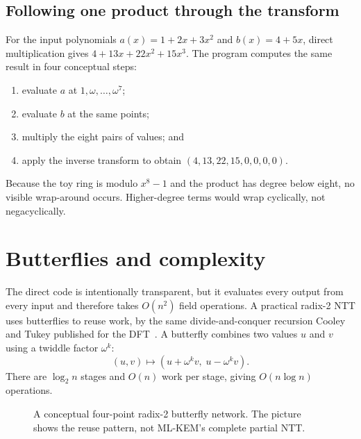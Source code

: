 \subsection{Following one product through the transform}

For the input polynomials $a(x)=1+2x+3x^2$ and $b(x)=4+5x$, direct multiplication gives $4+13x+22x^2+15x^3$. The program computes the same result in four conceptual steps:
\begin{enumerate}
  \item evaluate $a$ at $1,\omega,\ldots,\omega^7$;
  \item evaluate $b$ at the same points;
  \item multiply the eight pairs of values; and
  \item apply the inverse transform to obtain $(4,13,22,15,0,0,0,0)$.
\end{enumerate}
Because the toy ring is modulo $x^8-1$ and the product has degree below eight, no visible wrap-around occurs. Higher-degree terms would wrap cyclically, not negacyclically.

\section{Butterflies and complexity}

The direct code is intentionally transparent, but it evaluates every output from every input and therefore takes $O(n^2)$ field operations. A practical radix-2 NTT uses butterflies to reuse work, by the same divide-and-conquer recursion Cooley and Tukey published for the DFT~\cite{cooleytukey1965}. A butterfly combines two values $u$ and $v$ using a twiddle factor $\omega^k$:
\[
(u,v)\longmapsto(u+\omega^k v,\;u-\omega^k v).
\]
There are $\log_2n$ stages and $O(n)$ work per stage, giving $O(n\log n)$ operations.

\begin{figure}[H]
\centering
{}
\caption{A conceptual four-point radix-2 butterfly network. The picture shows the reuse pattern, not ML-KEM's complete partial NTT.}
\label{fig:toy-ntt-butterfly}
\end{figure}

